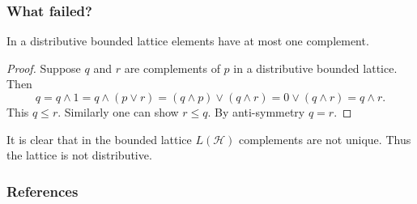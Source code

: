 \documentclass{beamer}
\begin{document}
\begin{frame}

	\frametitle{What failed?}
	
	\begin{theorem}
		
		In a distributive bounded lattice elements have at most one complement.		
		
	\end{theorem}
	
	\begin{proof}
	
		Suppose $q$ and $r$ are complements of $p$ in a distributive bounded lattice. Then
		\begin{equation}
			q=q\wedge 1=q\wedge(p\vee r)=(q\wedge p)\vee(q\wedge r)=0\vee(q\wedge r)=q\wedge r.
		\end{equation}			
		This $q\leq r$. Similarly one can show $r\leq q$. By anti-symmetry $q=r$.
	\end{proof}

It is clear that in the bounded lattice $L(\mathcal{H})$ complements are not unique. Thus the lattice is not distributive.

\end{frame}
	
\begin{frame}[allowframebreaks]
	
	\frametitle{References}

	
	

\end{frame}
\end{document}

